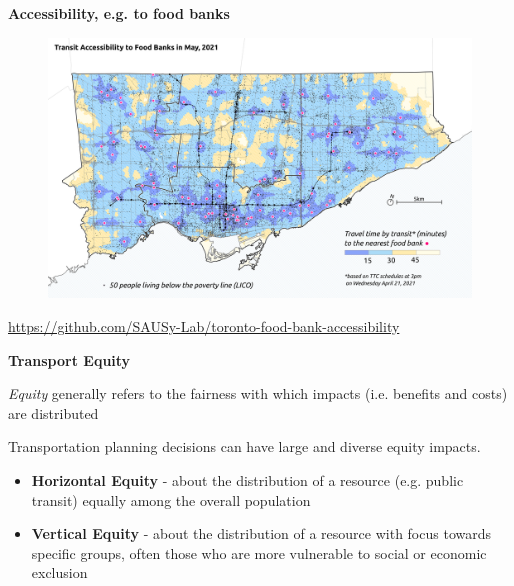 \documentclass[aspectratio=169]{beamer}
\begin{document}
\begin{frame}
	
	\textbf{Accessibility, e.g. to food banks}
	
	\begin{figure}
		\centering
		\includegraphics[width=0.94\linewidth]{images/foodbanks_access.png}
	\end{figure}
	
	\tiny 
	\url{https://github.com/SAUSy-Lab/toronto-food-bank-accessibility}
	
\end{frame}









\begin{frame}
	
	\textbf{Transport Equity}
	
	\vspace{4mm}
	
	
	\textit{Equity} generally refers to the fairness with which impacts (i.e. benefits and costs) are distributed 
	
	\vspace{2mm}
	
	Transportation planning decisions can have large and diverse equity
	impacts.
	
	\vspace{2mm}
	
	
	\begin{itemize}	
		\item \textbf{Horizontal Equity} - about the distribution of a resource (e.g. public transit) equally among the overall population
		
		\item \textbf{Vertical Equity} - about the distribution of a resource with focus towards specific groups, often those who are more vulnerable to social or economic exclusion
	\end{itemize}
	
	
\end{frame}
\end{document}
